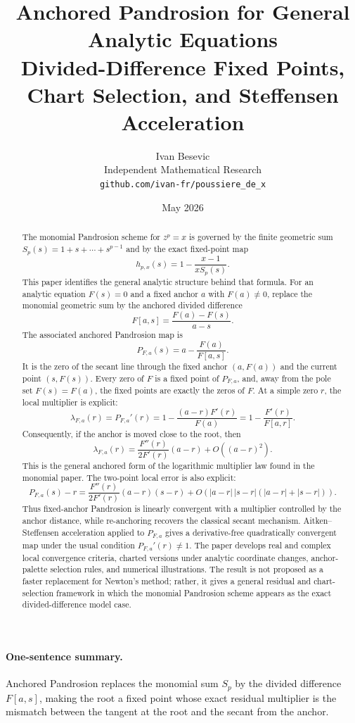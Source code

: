\documentclass[11pt]{article}
\title{Anchored Pandrosion for General Analytic Equations\\
\large Divided-Difference Fixed Points, Chart Selection, and Steffensen Acceleration}
\author{Ivan Besevic\\
Independent Mathematical Research\\
\texttt{github.com/ivan-fr/poussiere\_de\_x}}
\date{May 2026}
\theoremstyle{definition}
\begin{document}
\maketitle

\begin{abstract}
The monomial Pandrosion scheme for $z^p=x$ is governed by the finite geometric sum
$S_p(s)=1+s+\cdots+s^{p-1}$ and by the exact fixed-point map
\[
        h_{p,x}(s)=1-\frac{x-1}{xS_p(s)}.
\]
This paper identifies the general analytic structure behind that formula.  For an analytic equation
$F(s)=0$ and a fixed anchor $a$ with $F(a)\ne0$, replace the monomial geometric sum by the anchored divided difference
\[
        F[a,s]=\frac{F(a)-F(s)}{a-s}.
\]
The associated anchored Pandrosion map is
\[
        P_{F,a}(s)=a-\frac{F(a)}{F[a,s]}.
\]
It is the zero of the secant line through the fixed anchor $(a,F(a))$ and the current point $(s,F(s))$.  Every zero of
$F$ is a fixed point of $P_{F,a}$, and, away from the pole set $F(s)=F(a)$, the fixed points are exactly the zeros of
$F$.  At a simple zero $r$, the local multiplier is explicit:
\[
        \lambda_{F,a}(r)=P_{F,a}'(r)
        =1-\frac{(a-r)F'(r)}{F(a)}
        =1-\frac{F'(r)}{F[a,r]}.
\]
Consequently, if the anchor is moved close to the root, then
\[
        \lambda_{F,a}(r)=\frac{F''(r)}{2F'(r)}(a-r)+O((a-r)^2).
\]
This is the general anchored form of the logarithmic multiplier law found in the monomial paper.  The two-point local error is also explicit:
\[
        P_{F,a}(s)-r=\frac{F''(r)}{2F'(r)}(a-r)(s-r)
        +O(|a-r|\,|s-r|(|a-r|+|s-r|)).
\]
Thus fixed-anchor Pandrosion is linearly convergent with a multiplier controlled by the anchor distance, while re-anchoring recovers the classical secant mechanism.  Aitken--Steffensen acceleration applied to $P_{F,a}$ gives a derivative-free quadratically convergent map under the usual condition $P_{F,a}'(r)\ne1$.  The paper develops real and complex local convergence criteria, charted versions under analytic coordinate changes, anchor-palette selection rules, and numerical illustrations.  The result is not proposed as a faster replacement for Newton's method; rather, it gives a general residual and chart-selection framework in which the monomial Pandrosion scheme appears as the exact divided-difference model case.
\end{abstract}

\paragraph{One-sentence summary.}
Anchored Pandrosion replaces the monomial sum $S_p$ by the divided difference $F[a,s]$, making the root a fixed point whose exact residual multiplier is the mismatch between the tangent at the root and the secant from the anchor.
\end{document}
